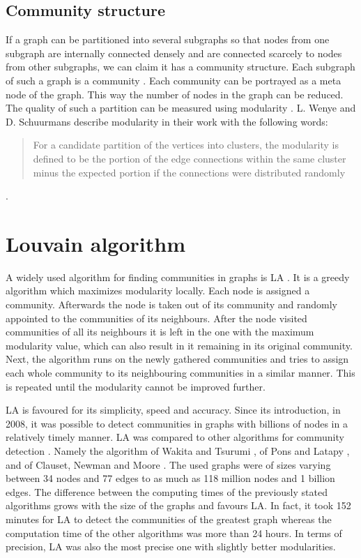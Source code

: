 \subsection{Community structure}
If a graph can be partitioned into several subgraphs so that nodes from one subgraph are internally connected densely and are connected scarcely to nodes from other subgraphs, we can claim it has a community structure. Each subgraph of such a graph is a community \cite{communitiesOverview}. Each community can be portrayed as a meta node of the graph. This way the number of nodes in the graph can be reduced. The quality of such a partition can be measured using modularity \cite{modularityOverview}. L. Wenye and D. Schuurmans describe modularity in their work with the following words: \begin{quotation}  For a candidate partition of the vertices into clusters, the modularity is defined to be the portion of the edge connections within the same cluster minus the expected portion if the connections were distributed randomly \cite{modularityDefinition} \end{quotation} \cite{modularityOverview}.

\section{Louvain algorithm} \label{louvainAlgorithm}
A widely used algorithm for finding communities in graphs is LA \cite{louvainAlgorithm}. It is a greedy algorithm which maximizes modularity locally. Each node is assigned a community. Afterwards the node is taken out of its community and randomly appointed to the communities of its neighbours. After the node visited communities of all its neighbours it is left in the one with the maximum modularity value, which can also result in it remaining in its original community. Next, the algorithm runs on the newly gathered communities and tries to assign each whole community to its neighbouring communities in a similar manner. This is repeated until the modularity cannot be improved further.

LA is favoured for its simplicity, speed and accuracy. Since its introduction, in 2008, it was possible to detect communities in graphs with billions of nodes in a relatively timely manner. LA was compared to other algorithms for community detection \cite{louvainAlgorithm}.  Namely the algorithm of Wakita and Tsurumi \cite{wakitaAndToshiyuki}, of Pons and Latapy \cite{ponsAndLatapy}, and of Clauset, Newman and Moore \cite{CNM}. The used graphs were of sizes varying between 34 nodes and 77 edges to as much as 118 million nodes and 1 billion edges. The difference between the computing times of the previously stated algorithms grows with the size of the graphs and favours LA. In fact, it took 152 minutes for LA to detect the communities of the greatest graph whereas the computation time of the other algorithms was more than 24 hours. In terms of precision, LA was also the most precise one with slightly better modularities.

